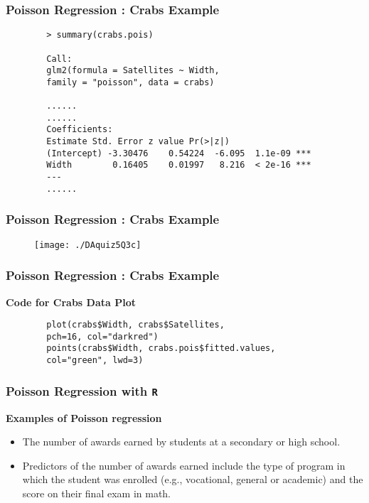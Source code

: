 \documentclass[MASTER.tex]{subfiles}
\begin{document}
	\begin{frame}[fragile]
		\frametitle{Poisson Regression :  Crabs Example}
		\begin{verbatim}
		> summary(crabs.pois)
		
		Call:
		glm2(formula = Satellites ~ Width, 
		family = "poisson", data = crabs)
		
		...... 
		......
		Coefficients:
		Estimate Std. Error z value Pr(>|z|)    
		(Intercept) -3.30476    0.54224  -6.095  1.1e-09 ***
		Width        0.16405    0.01997   8.216  < 2e-16 ***
		---
		...... 
		\end{verbatim}
	
\end{frame}
\begin{frame}[fragile]
	\frametitle{Poisson Regression :  Crabs Example}
	\begin{figure}[h!]
		\centering
		\texttt{[image: ./DAquiz5Q3c]}
	\end{figure}
\end{frame}
\begin{frame}[fragile]
	\frametitle{Poisson Regression :  Crabs Example}
	
	\textbf{Code for Crabs Data Plot}
	\begin{framed}
		\begin{verbatim}
		plot(crabs$Width, crabs$Satellites,
		pch=16, col="darkred")
		points(crabs$Width, crabs.pois$fitted.values, 
		col="green", lwd=3)
		\end{verbatim}
	\end{framed}
\end{frame}

\begin{frame}[fragile]

\frametitle{Poisson Regression with \texttt{R} } 
 
 \Large	
 
 \textbf{Examples of Poisson regression} \\
 	
 \begin{itemize}	
 \item The number of awards earned by students at a secondary or high school. 
 \item Predictors of the number of awards earned include the type of program in which the student was enrolled (e.g., vocational, general or academic) and the score on their final exam in math.
 \end{itemize}
 
\end{frame}
\end{document}
